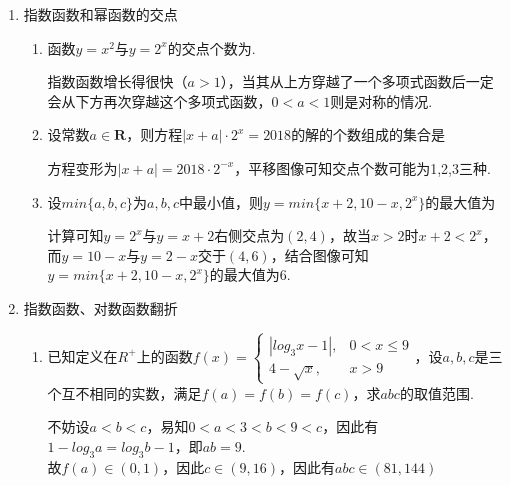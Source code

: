 \begin{enumerate}
\begin{enumerate}
        \item 当$x \in (0, +\infty)$时，幂函数$f(x) = (m^2-m-1)x^{-5m-3}$为增函数，则实数$m =$
        \begin{jieda}
            由幂函数概念可知$m^2-m-1 = 1$，解得$m = -1 \mbox{或} 2$，又因为$f(x)$在$(0, +\infty)$为增函数，所以有$-5m-3 > 0$，因此$m = -1$
        \end{jieda}
    \end{enumerate}
    \item 指数函数和幂函数的交点
    \begin{enumerate}
        \item 函数$y = x^2$与$y = 2^x$的交点个数为. 
        \begin{jieda}
            指数函数增长得很快（$a > 1$），当其从上方穿越了一个多项式函数后一定会从下方再次穿越这个多项式函数，$0 < a < 1$则是对称的情况.
        \end{jieda}
        \item 设常数$a \in \mathbf{R}$，则方程$|x+a| \cdot 2^x = 2018$的解的个数组成的集合是
        \begin{jieda}
            方程变形为$|x+a| = 2018 \cdot 2^{-x}$，平移图像可知交点个数可能为1,2,3三种.
        \end{jieda}
        \item 设$min\{a, b, c\}$为$a, b, c$中最小值，则$y = min\{x+2, 10-x, 2^x\}$的最大值为
        \begin{jieda}
            计算可知$y = 2^x$与$y = x+2$右侧交点为$(2, 4)$，故当$x > 2$时$x+2 < 2^x$，而$y = 10-x$与$y = 2-x$交于$(4, 6)$，结合图像可知$y = min\{x+2, 10-x, 2^x\}$的最大值为6.
        \end{jieda}
    \end{enumerate}
    \item 指数函数、对数函数翻折
    \begin{enumerate}
        \item 已知定义在$R^{+}$上的函数$f(x) = \left \{\begin{array}{ll}
        |log_3x - 1|, & 0 < x \leq 9 \\
        4-\sqrt{x}, & x > 9
        \end{array} \right.$，设$a, b, c$是三个互不相同的实数，满足$f(a) = f(b) = f(c)$，求$abc$的取值范围.
        \begin{jieda}
            不妨设$a < b < c$，易知$0 < a < 3 < b < 9< c$，因此有$1 - log_3a = log_3b - 1$，即$ab = 9$. \\
            故$f(a) \in (0, 1)$，因此$c \in (9, 16)$，因此有$abc \in (81, 144)$

\end{jieda}
\end{enumerate}
\end{enumerate}
